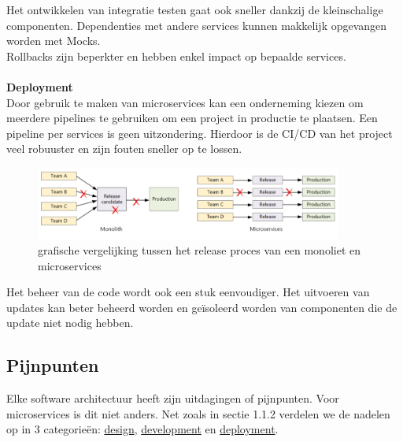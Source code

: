 Het ontwikkelen van integratie testen gaat ook sneller dankzij de kleinschalige componenten. Dependenties met andere services kunnen makkelijk opgevangen worden met Mocks.\\
Rollbacks zijn beperkter en hebben enkel impact op bepaalde services.\\ \\
\textbf{Deployment}\\ Door gebruik te maken van microservices kan een onderneming kiezen om meerdere pipelines te gebruiken om een project in productie te plaatsen. Een pipeline per services is geen uitzondering. Hierdoor is de CI/CD van het project veel robuuster en zijn fouten sneller op te lossen.

\begin{figure}[!htb]
    \centering
    \includegraphics[width=0.9\textwidth]{PipelinesVS.png}    
    \caption{grafische vergelijking tussen het release proces van een monoliet en microservices \label{pipelin}}
\end{figure}

Het beheer van de code wordt ook een stuk eenvoudiger. Het uitvoeren van updates kan beter beheerd worden en geïsoleerd worden van componenten die de update niet nodig hebben.


\subsection{Pijnpunten}

Elke software architectuur heeft zijn uitdagingen of pijnpunten. Voor microservices is dit niet anders. Net zoals in sectie 1.1.2 verdelen we de nadelen op in 3 categorieën: \underline{design}, \underline{development} en \underline{deployment}.\\ \\

